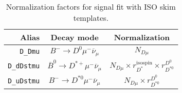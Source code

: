 


\begin{landscape}
\begin{table}
\centering
\caption{
    Normalization factors for \Dz signal fit with ISO skim templates.
}
\label{tab:fit-norm-fact-d0}
\scriptsize

\begin{tabular}{r|c|c}
\toprule
           \textbf{Alias} &                                 \textbf{Decay mode}                                  &                                                                                                                                                                       \textbf{Normalization}                                                                                                                                                                        \\
\midrule
          \texttt{D\_Dmu} &                    $B^- \rightarrow D^0 \mu^- \overline{\nu}_\mu$                    &                                                                                                                                                                             $N_{D \mu}$                                                                                                                                                                             \\
       \texttt{D\_dDstmu} &             $\overline{B}^0 \rightarrow D^{*+} \mu^- \overline{\nu}_\mu$             &                                                                                                                                                  $N_{D \mu} \times r_{D^*}^\text{isospin} \times r_{D^{*0}}^{D^0}$                                                                                                                                                  \\
       \texttt{D\_uDstmu} &                  $B^- \rightarrow D^{*0} \mu^- \overline{\nu}_\mu$                   &                                                                                                                                                                 $N_{D \mu} \times r_{D^{*0}}^{D^0}$                                                                                                                                                                 \\

\end{tabular}
\end{table}
\end{landscape}
